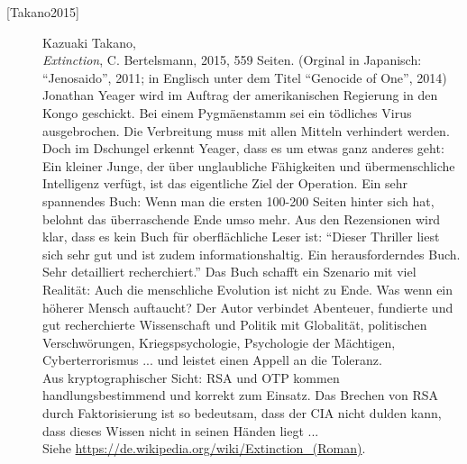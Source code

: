 \begin{refsegment}
\begin{description}
\item[\textrm{[Takano2015]}] 
    Kazuaki Takano, \\
    {\em Extinction}, C. Bertelsmann, 2015, 559 Seiten. (Orginal in Japanisch: "`Jenosaido"', 2011;
    in Englisch unter dem Titel "`Genocide of One"', 2014)\\
    Jonathan Yeager wird im Auftrag der amerikanischen Regierung in den Kongo geschickt.
    Bei einem Pygmäenstamm sei ein tödliches Virus ausgebrochen. Die Verbreitung muss
    mit allen Mitteln verhindert werden. Doch im Dschungel erkennt Yeager, dass es um
    etwas ganz anderes geht: Ein kleiner Junge, der über unglaubliche Fähigkeiten und
    übermenschliche Intelligenz verfügt, ist das eigentliche Ziel der Operation.
    Ein sehr spannendes Buch: Wenn man die ersten 100-200 Seiten hinter sich hat,
    belohnt das überraschende Ende umso mehr. Aus den Rezensionen wird klar, dass es
    kein Buch für oberflächliche Leser ist: "`Dieser Thriller liest sich sehr gut und
    ist zudem informationshaltig. Ein herausforderndes Buch. Sehr detailliert recherchiert."'
    Das Buch schafft ein Szenario mit viel Realität: Auch die menschliche Evolution ist
    nicht zu Ende. Was wenn ein höherer Mensch auftaucht? Der Autor verbindet Abenteuer,
    fundierte und gut recherchierte Wissenschaft und Politik mit Globalität, politischen
    Verschwörungen, Kriegspsychologie, Psychologie der Mächtigen, Cyberterrorismus ...
    und leistet einen Appell an die Toleranz.\\
    Aus kryptographischer Sicht: RSA und OTP kommen handlungsbestimmend und korrekt zum Einsatz.
    Das Brechen von RSA durch Faktorisierung ist so bedeutsam, dass der CIA nicht
    dulden kann, dass dieses Wissen nicht in seinen Händen liegt ...\\
    Siehe \url{https://de.wikipedia.org/wiki/Extinction_(Roman)}.\\





\end{description}
\end{refsegment}
